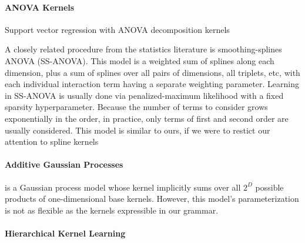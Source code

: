 \documentclass[twoside]{article}
\begin{document}
\paragraph{ANOVA Kernels}

Support vector regression with ANOVA decomposition kernels \cite{stitson1999support}

A closely related procedure from the statistics literature is smoothing-splines ANOVA (SS-ANOVA)\cite{wahba1990spline, gu2002smoothing}.
This model is a weighted sum of splines along each dimension, plus a sum of splines over all pairs of dimensions, all triplets, etc, with each individual interaction term having a separate weighting parameter.
Learning in SS-ANOVA is usually done via penalized-maximum likelihood with a fixed sparsity hyperparameter.
Because the number of terms to consider grows exponentially in the order, in practice, only terms of first and second order are usually considered.  This model is similar to ours, if we were to restict our attention to spline kernels

\paragraph{Additive Gaussian Processes} \cite{duvenaud2011additive11} is a Gaussian process model whose kernel implicitly sums over all $2^D$ possible products of one-dimensional base kernels.  
However, this model's parameterization is not as flexible as the kernels expressible in our grammar.

\paragraph{Hierarchical Kernel Learning}
\end{document}
